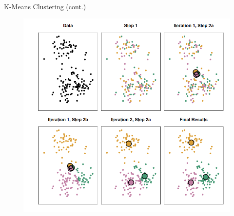\documentclass{beamer}
\begin{document}
\begin{frame}{K-Means Clustering (cont.)}
 
 	\begin{figure}[h]
 	\centering
 	\includegraphics[scale=0.55]{Figures/kmeans_clustering.png}
 	\end{figure}
 
\end{frame}
\end{document}
